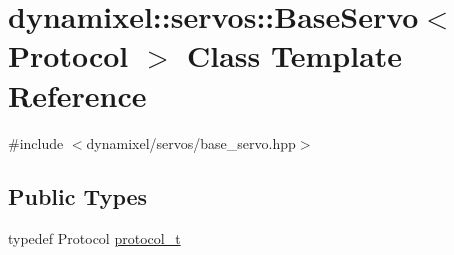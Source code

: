 \hypertarget{classdynamixel_1_1servos_1_1_base_servo}{}\section{dynamixel\+:\+:servos\+:\+:Base\+Servo$<$ Protocol $>$ Class Template Reference}
\label{classdynamixel_1_1servos_1_1_base_servo}


{\ttfamily \#include $<$dynamixel/servos/base\+\_\+servo.\+hpp$>$}

\subsection*{Public Types}
\begin{DoxyCompactItemize}
\item 
typedef Protocol \hyperlink{classdynamixel_1_1servos_1_1_base_servo_ac484c11279ee2576a9a3bb8c940e0baf}{protocol\+\_\+t}
\end{DoxyCompactItemize}
